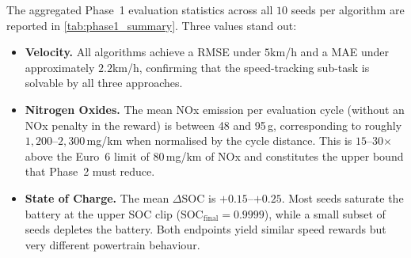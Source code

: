 The aggregated Phase~1 evaluation statistics across all $10$ seeds per algorithm are reported in \autoref{tab:phase1_summary}. Three values stand out:
\begin{itemize}
  \item \textbf{Velocity.} All algorithms achieve a \ac{RMSE} under $5$km/h and a MAE under approximately $2.2$km/h, confirming that the speed-tracking sub-task is solvable by all three approaches.
  \item \textbf{Nitrogen Oxides.} The mean \ac{NOx} emission per evaluation cycle (without an \ac{NOx} penalty in the reward) is between 48 and 95\,g, corresponding to roughly $1{,}200$--$2{,}300$\,mg/km when normalised by the cycle distance. This is $15$--$30$$\times$ above the Euro~6 limit of $80$\,mg/km of \ac{NOx} and constitutes the upper bound that Phase~2 must reduce.
  \item \textbf{State of Charge.} The mean $\Delta\text{SOC}$ is $+0.15$--$+0.25$. Most seeds saturate the battery at the upper \ac{SOC} clip ($\text{SOC}_{\text{final}} = 0.9999$), while a small subset of seeds depletes the battery. Both endpoints yield similar speed rewards but very different powertrain behaviour.
\end{itemize}

